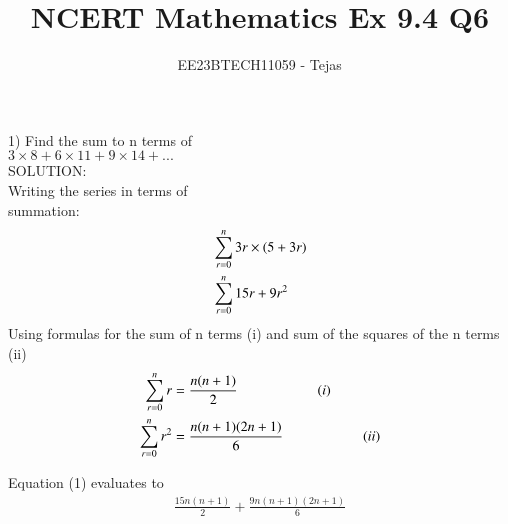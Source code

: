 \documentclass[journal,12pt,twocolumn]{IEEEtran}
\theoremstyle{remark}
\begin{document}

\vspace{3cm}

\title{NCERT Mathematics Ex 9.4 Q6}
\author{EE23BTECH11059 - Tejas$^{}$%
}
\maketitle
\newpage

        \Large
        1) Find the sum to n terms of\\$3 \times 8 + 6 \times 11 + 9 \times 14 + ...$
    \vspace{1cm}
    \Large
    \\
        \Large
        SOLUTION: \\
        \Large
        Writing the series in terms of\\summation:
        \begin{align}
            &\sum_{r=0}^{n}3r\times(5+3r) \notag \\
            &\sum_{r=0}^{n}15r+9r^2 
        \end{align}
        Using formulas for the sum of n terms (i) and sum of the squares of the n terms (ii) \\
          \begin{align}
            \sum_{r=0}^{n}r&=\frac{n(n+1)}{2} \hspace{2cm}(i)\notag \\
            \sum_{r=0}^{n}r^2&=\frac{n(n+1)(2n+1)}{6} \hspace{2cm}(ii)\notag 
        \end{align}
        
        
        Equation (1) evaluates to
             \begin{align*}
                \frac{15n(n+1)}{2} + \frac{9n(n+1)(2n+1)}{6} 
            \end{align*}
            
            \begin{flushleft}
                \hspace{0.5cm} \notag
                 \notag
            \end{flushleft}
             
             
             
        

        













\renewcommand{\thefigure}{\theenumi}
\renewcommand{\thetable}{\theenumi}
\end{document}
